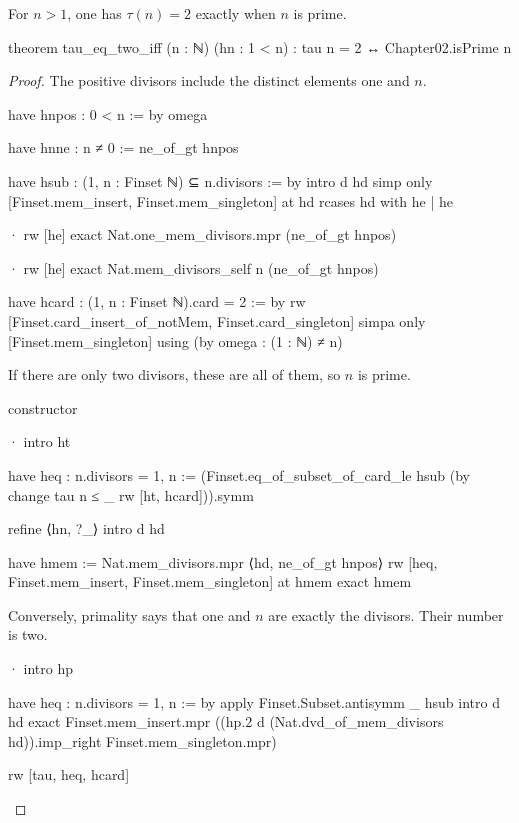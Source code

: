 \begin{theorem}
  \label{ent:thm:tau-eq-two-iff}
  For $n>1$, one has $\tau(n)=2$ exactly when $n$ is prime.

  \begin{lean}
    theorem tau_eq_two_iff (n : ℕ) (hn : 1 < n) : tau n = 2 ↔ Chapter02.isPrime n
  \end{lean}
\end{theorem}

\begin{proof}
  The positive divisors include the distinct elements one and $n$.

  \begin{lean}
    have hnpos : 0 < n := by
      omega

    have hnne : n ≠ 0 := ne_of_gt hnpos

    have hsub : ({1, n} : Finset ℕ) ⊆ n.divisors := by
      intro d hd
      simp only [Finset.mem_insert, Finset.mem_singleton] at hd
      rcases hd with he | he

      · rw [he]
        exact Nat.one_mem_divisors.mpr (ne_of_gt hnpos)

      · rw [he]
        exact Nat.mem_divisors_self n (ne_of_gt hnpos)

    have hcard : ({1, n} : Finset ℕ).card = 2 := by
      rw [Finset.card_insert_of_notMem, Finset.card_singleton]
      simpa only [Finset.mem_singleton] using (by omega : (1 : ℕ) ≠ n)
  \end{lean}

  If there are only two divisors, these are all of them, so $n$ is prime.

  \begin{lean}
    constructor

    · intro ht

      have heq : n.divisors = {1, n} :=
        (Finset.eq_of_subset_of_card_le hsub (by
            change tau n ≤ _
            rw [ht, hcard])).symm

      refine ⟨hn, ?_⟩
      intro d hd

      have hmem := Nat.mem_divisors.mpr ⟨hd, ne_of_gt hnpos⟩
      rw [heq, Finset.mem_insert, Finset.mem_singleton] at hmem
      exact hmem
  \end{lean}

  Conversely, primality says that one and $n$ are exactly the divisors.
  Their number is two.

  \begin{lean}
    · intro hp

      have heq : n.divisors = {1, n} := by
        apply Finset.Subset.antisymm _ hsub
        intro d hd
        exact Finset.mem_insert.mpr ((hp.2 d (Nat.dvd_of_mem_divisors hd)).imp_right
          Finset.mem_singleton.mpr)

      rw [tau, heq, hcard]
  \end{lean}
\end{proof}

